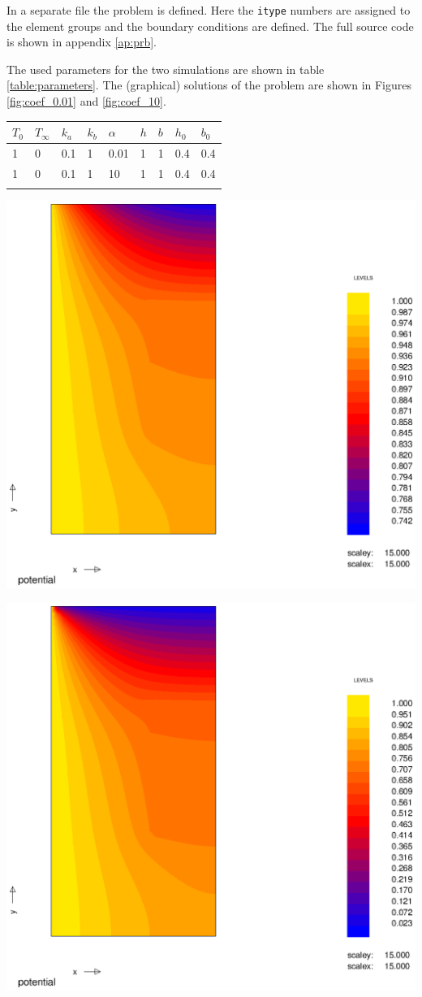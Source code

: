 In a separate file the problem is defined. Here the \texttt{itype} numbers are assigned to the element groups and the boundary conditions are defined. The full source code is shown in appendix \ref{ap:prb}.

The used parameters for the two simulations are shown in table \ref{table:parameters}. The (graphical) solutions of the problem are shown in Figures \ref{fig:coef_0.01} and \ref{fig:coef_10}. 

\begin{center}
\centerfloat
{}
\begin{tabular}{lllllllll}
\hline \hline
$T_0$ & $T_{\infty}$ & $k_a$ & $k_b$ & $\alpha$ & $h$ & $b$ & $h_0$ & $b_0$\\
\hline
1 & 0 & 0.1 & 1 & 0.01 & 1 & 1 & 0.4 & 0.4\\
1 & 0 & 0.1 & 1 & 10 & 1 & 1 & 0.4 & 0.4\\
\hline \hline
\label{table:parameters}
\end{tabular}
\vspace{-0.1cm}
\end{center}


\begin{Figure}
 \centerfloat
 \includegraphics[width=0.75\linewidth]{coef_001.eps}
 \label{fig:coef_0.01}
\end{Figure}


\begin{Figure}
 \centerfloat
 \includegraphics[width=0.75\linewidth]{coef_10.eps}
 \label{fig:coef_10}
\end{Figure}